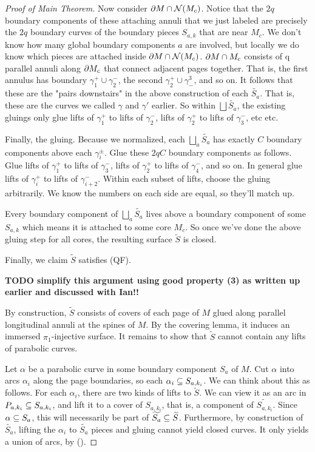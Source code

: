 \begin{proof}[Proof of Main Theorem]
Now consider $\partial M \cap \mathcal{N}(M_c)$. Notice that the $2q$ boundary components of these
attaching annuli that we just labeled are precisely the $2q$ boundary curves of
the boundary pieces $S_{a,k}$ that are near $M_c$. We don't know how many global
boundary components $a$ are involved, but locally we do know which pieces are
attached inside $\partial M \cap \mathcal{N}(M_c)$. $\partial M \cap M_c$ consists of q parallel annuli
along $\partial M_c$ that connect adjacent pages together. That is, the first annulus
has boundary $\gamma_1^+ \cup \gamma_2^-$, the second $\gamma_2^+ \cup
\gamma^3_-$, and so on.  It follows that these are the "pairs downstairs" in
the above construction of each $\widetilde{S_a}$. That is, these are the curves
we called $\gamma$ and $\gamma'$ earlier.  So within $\bigsqcup \widetilde{S_a}$,
the existing gluings only glue lifts of $\gamma_1^+$ to lifts of $\gamma_2^-$,
lifts of $\gamma_2^+$ to lifts of $\gamma_3^-$, etc etc.

Finally, the gluing. Because we normalized, each $\bigsqcup_a \widetilde{S_a}$ has
exactly $C$ boundary components above each $\gamma_i^\pm$.  Glue these $2qC$
boundary components as follows. Glue lifts of $\gamma_1^+$ to lifts of
$\gamma_3^-$, lifts of $\gamma_2^+$ to lifts of $\gamma_4^-$, and so on. In
general glue lifts of $\gamma_i^+$ to lifts of $\gamma_{i+2}^-$. Within each
subset of lifts, choose the gluing arbitrarily. We know the numbers on each
side are equal, so they'll match up.

Every boundary component of $\bigsqcup_a \widetilde{S_a}$ lives above a boundary component
of some $S_{a,k}$ which means it is attached to some core $M_c$. So once we've done
the above gluing step for all cores, the resulting surface $\widetilde{S}$ is closed.


Finally, we claim $\widetilde{S}$ satisfies (QF).


\textbf{TODO simplify this argument using good property (3) as written up
earlier and discussed with Ian!!}

By construction, $\widetilde{S}$ consists of covers of each page of $M$ glued along
parallel longitudinal annuli at the spines of $M$. By the covering lemma, it
induces an immersed $\pi_1$-injective surface. It remains to show that
$\widetilde{S}$ cannot contain any lifts of parabolic curves.

Let $\alpha$ be a parabolic curve in some boundary component $S_a$ of $M$. Cut
$\alpha$ into arcs $\alpha_i$ along the page boundaries, so each $\alpha_i \subseteq
S_{a,k_i}$.  We can think about this as follows. For each $\alpha_i$, there are two
kinds of lifts to $\widetilde{S}$. We can view it as an arc in $P_{a,k_i} \subseteq
S_{a,k_i}$, and lift it to a cover of $S_{a,k_i}$, that is, a component of
$\widetilde{S_{a,k_i}}$. Since $\alpha \subseteq S_a$, this will necessarily be part
of $\widetilde{S_a} \subseteq \widetilde{S}$. Furthermore, by construction of
$\widetilde{S_a}$, lifting the $\alpha_i$ to $\widetilde{S_a}$ pieces and
gluing cannot yield closed curves.  It only yields a union of arcs, by (\dag).


\end{proof}
